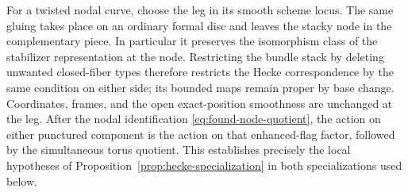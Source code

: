 For a twisted nodal curve, choose the leg in its smooth scheme locus.
The same gluing takes place on an ordinary formal disc and leaves the
stacky node in the complementary piece.  In particular it preserves
the isomorphism class of the stabilizer representation at the node.
Restricting the bundle stack by deleting unwanted closed-fiber types
therefore restricts the Hecke correspondence by the same condition on
either side; its bounded maps remain proper by base change.  Coordinates,
frames, and the open exact-position smoothness are unchanged at the
leg.  After the nodal identification
\eqref{eq:found-node-quotient}, the action on either punctured component
is the action on that enhanced-flag factor, followed by the simultaneous
torus quotient.  This establishes precisely the local hypotheses of
Proposition~\ref{prop:hecke-specialization} in both specializations
used below.

